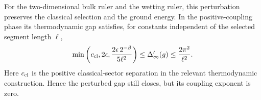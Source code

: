 \begin{theorem}
\label{thm:instability}
For the two-dimensional bulk ruler and the wetting ruler, this perturbation preserves the
classical selection and the ground energy. In the positive-coupling
phase its thermodynamic gap satisfies, for constants independent of
the selected segment length $\ell$,
\begin{equation}\label{eq:instability}
 \min\left(c_{\rm cl},2\epsilon,
       \frac{2\epsilon\,2^{-\beta}}{5\ell^2}\right)
 \leq\Delta'_\infty(g)\leq\frac{2\pi^2}{\ell^2}.
\end{equation}
Here $c_{\rm cl}$ is the positive classical-sector separation in
the relevant thermodynamic construction. Hence the perturbed gap
still closes, but its coupling exponent is zero.
\end{theorem}
